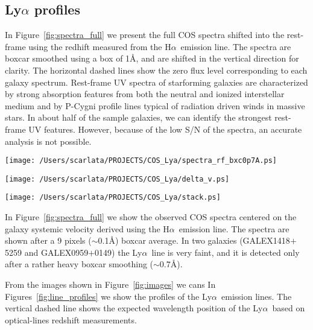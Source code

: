 \documentclass[manuscript]{emulateapj}
\newcommand{\lya}{Ly$\alpha$}
\newcommand{\ha}{H$\alpha$}
\begin{document}
\subsection{Ly$\alpha$ profiles}

In Figure~\ref{fig:spectra_full} we present the full COS spectra
shifted into the rest-frame using the redhift measured from the \ha\
emission line. The spectra are boxcar smoothed using a box of 1\AA,
and are shifted in the vertical direction for clarity.  The horizontal
dashed lines show the zero flux level corresponding to each galaxy
spectrum. Rest-frame UV spectra of starforming galaxies are
characterized by strong absorption features from both the neutral and
ionized interstellar medium and by P-Cygni profile lines typical of
radiation driven winds in massive stars. In about half of the sample
galaxies, we can identify the strongest rest-frame UV features.
However, because of the low S/N of the spectra, an accurate analysis
is not possible.



\begin{figure*}[]
   \centering
   \texttt{[image: /Users/scarlata/PROJECTS/COS\_Lya/spectra\_rf\_bxc0p7A.ps]}
   \caption{Rest-frame COS spectra of the 25 sample galaxies around the \lya\
     emission lines. The systemic velocity is determined from the
     nebular \ha\ line. }
   \label{fig:spectra_full}
\end{figure*}


\begin{figure*}[]
   \centering
   \texttt{[image: /Users/scarlata/PROJECTS/COS\_Lya/delta\_v.ps]}
   \caption{Histogram of the velocity shifts between the 
\lya\ and \ha\ lines.}
   \label{fig:stack}
\end{figure*}

\begin{figure*}[]
   \centering
   \texttt{[image: /Users/scarlata/PROJECTS/COS\_Lya/stack.ps]}
   \caption{Composite spectrum from XXX galaxies.}
   \label{fig:stack}
\end{figure*}

In Figure~\ref{fig:spectra_full} we show the observed COS spectra
centered on the galaxy systemic velocity derived using the \ha\
emission line. The spectra are shown after a 9 pixels ($\sim$0.1\AA)
boxcar average. In two galaxies (GALEX1418$+$5259 and
GALEX0959$+$0149) the \lya\ line is very faint, and it is detected
only after a rather heavy boxcar smoothing ($\sim 0.7$\AA).

From the images shown in Figure~\ref{fig:images} we cans 
In Figures~\ref{fig:line_profiles} we show the profiles of the \lya\
emission lines. The vertical dashed line shows the expected wavelength
position of the \lya\ based on optical-lines redshift measurements.
\end{document}
